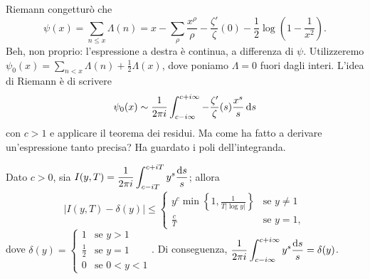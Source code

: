 Riemann congetturò che
$$\psi(x)=\sum_{n \le x} \Lambda(n)=x-\sum_{\rho} \frac{x^{\rho}}{\rho}-\frac{\zeta'}{\zeta}(0)-\frac{1}{2}\log\left(1-\frac{1}{x^2}\right).$$
Beh, non proprio: l'espressione a destra è continua, a differenza di $\psi$. Utilizzeremo $\psi_0(x)=\displaystyle \sum_{n<x} \Lambda(n)+\frac{1}{2}\Lambda(x)$, dove poniamo $\Lambda=0$ fuori dagli interi. L'idea di Riemann è di scrivere
$$\psi_0(x) \sim \frac{1}{2\pi i} \int_{c-i\infty}^{c+i\infty} -\frac{\zeta'}{\zeta}(s)\frac{x^s}{s}\mathop{}\!\mathrm{d} s$$
con $c>1$ e applicare il teorema dei residui. Ma come ha fatto a derivare un'espressione tanto precisa? Ha guardato i poli dell'integranda.

\begin{lm}
  Dato $c>0$, sia $I(y,T)=\displaystyle \frac{1}{2\pi i}\int_{c-iT}^{c+iT} y^s\frac{\mathop{}\!\mathrm{d} s}{s}$; allora
  $$|I(y,T)-\delta(y)| \le \begin{cases}
    y^c\min\left\{1,\frac{1}{T|\log{y}|}\right\} & \mbox{se } y\not=1 \\
    \frac{c}{T} & \mbox{se } y=1,
\end{cases}$$
dove $\delta(y)=\begin{cases}
  1 & \mbox{se } y>1 \\
  \frac{1}{2} & \mbox{se } y=1 \\
  0 & \mbox{se } 0<y<1
\end{cases}$. Di conseguenza, $\displaystyle \frac{1}{2\pi i}\int_{c-i\infty}^{c+i\infty} y^s\frac{\mathop{}\!\mathrm{d} s}{s}=\delta(y)$.
\end{lm}

